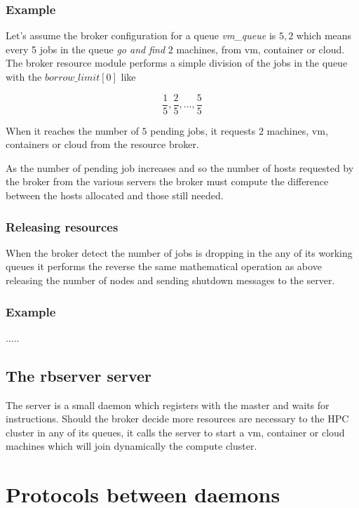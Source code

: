 \documentclass{report}
\begin{document}
\subsection{Example}

Let's assume the broker configuration for a queue \textit{vm\_queue} is \(5,2\) which means every 5 jobs in the queue \textit{go and find} \(2\) machines, from vm, container or cloud. The broker resource module performs a simple division of the jobs in the queue with the \(borrow\_limit[0]\) like

\[
\frac{1}{5},\frac{2}{5},..., \frac{5}{5}
\]

When it reaches the number of \(5\) pending jobs, it requests \(2\) machines, vm, containers or cloud from the resource broker.

As the number of pending job increases and so the number of hosts requested by the broker from the various servers the broker must compute the difference between the hosts allocated and those still needed.

\subsection{Releasing resources}

When the broker detect the number of jobs is dropping in the any of its working queues it performs the reverse the same mathematical operation as above releasing the number of nodes and sending shutdown messages to the
server.

\subsection{Example}

.....

\section{The \textbf{rbserver} server}

The server is a small daemon which registers with the master and waits for instructions. Should the broker decide more resources are necessary to the HPC cluster in any of its queues, it calls the server to start a vm, container or cloud  machines which will join dynamically the compute cluster.

\chapter{Protocols between daemons}
\noindent
\end{document}
